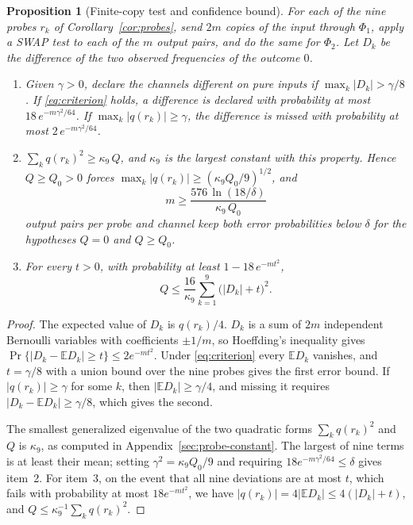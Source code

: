 \documentclass[12pt,a4paper]{article}
\newtheorem{proposition}[theorem]{Proposition}
\begin{document}
\begin{proposition}[Finite-copy test and confidence bound]
\label{prop:finite}
For each of the nine probes $r_k$ of Corollary~\ref{cor:probes}, send $2m$ copies of the input through $\Phi_1$, apply a SWAP test to each of the $m$ output pairs, and do the same for $\Phi_2$. Let $D_k$ be the difference of the two observed frequencies of the outcome $0$.
\begin{enumerate}
\item Given $\gamma>0$, declare the channels different on pure inputs if $\max_k|D_k|>\gamma/8$. If \eqref{eq:criterion} holds, a difference is declared with probability at most $18\,e^{-m\gamma^2/64}$. If $\max_k|q(r_k)|\ge\gamma$, the difference is missed with probability at most $2\,e^{-m\gamma^2/64}$.
\item $\sum_kq(r_k)^2\ge\kappa_9\,Q$, and $\kappa_9$ is the largest constant with this property. Hence $Q\ge Q_0>0$ forces $\max_k|q(r_k)|\ge(\kappa_9Q_0/9)^{1/2}$, and
\[
m\ge\frac{576\,\ln(18/\delta)}{\kappa_9\,Q_0}
\]
output pairs per probe and channel keep both error probabilities below $\delta$ for the hypotheses $Q=0$ and $Q\ge Q_0$.
\item For every $t>0$, with probability at least $1-18\,e^{-mt^2}$,
\[
Q\le\frac{16}{\kappa_9}\sum_{k=1}^9\bigl(|D_k|+t\bigr)^2 .
\]
\end{enumerate}
\end{proposition}

\begin{proof}
The expected value of $D_k$ is $q(r_k)/4$. $D_k$ is a sum of $2m$ independent Bernoulli variables with coefficients $\pm1/m$, so Hoeffding's inequality \cite{Hoeffding1963} gives $\Pr\{|D_k-\mathbb ED_k|\ge t\}\le2e^{-mt^2}$. Under \eqref{eq:criterion} every $\mathbb ED_k$ vanishes, and $t=\gamma/8$ with a union bound over the nine probes gives the first error bound. If $|q(r_k)|\ge\gamma$ for some $k$, then $|\mathbb ED_k|\ge\gamma/4$, and missing it requires $|D_k-\mathbb ED_k|\ge\gamma/8$, which gives the second.

The smallest generalized eigenvalue of the two quadratic forms
$\sum_kq(r_k)^2$ and $Q$ is $\kappa_9$, as computed in
Appendix~\ref{sec:probe-constant}. The largest of nine terms is at least their mean; setting $\gamma^2=\kappa_9Q_0/9$ and requiring $18e^{-m\gamma^2/64}\le\delta$ gives item~2. For item~3, on the event that all nine deviations are at most $t$, which fails with probability at most $18e^{-mt^2}$, we have $|q(r_k)|=4|\mathbb ED_k|\le4(|D_k|+t)$, and $Q\le\kappa_9^{-1}\sum_kq(r_k)^2$.
\end{proof}
\end{document}
